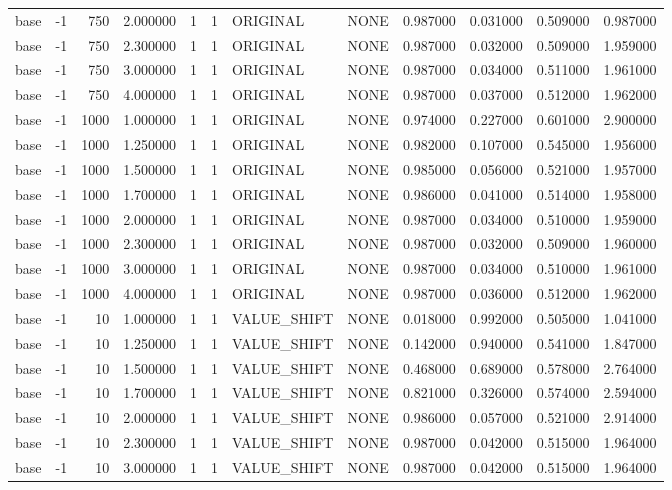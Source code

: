 \begin{tabular}{lrrrllllrrrr}
base & -1 & 750 & 2.000000 & 1 & 1 & ORIGINAL & NONE & 0.987000 & 0.031000 & 0.509000 & 0.987000 \\
base & -1 & 750 & 2.300000 & 1 & 1 & ORIGINAL & NONE & 0.987000 & 0.032000 & 0.509000 & 1.959000 \\
base & -1 & 750 & 3.000000 & 1 & 1 & ORIGINAL & NONE & 0.987000 & 0.034000 & 0.511000 & 1.961000 \\
base & -1 & 750 & 4.000000 & 1 & 1 & ORIGINAL & NONE & 0.987000 & 0.037000 & 0.512000 & 1.962000 \\
base & -1 & 1000 & 1.000000 & 1 & 1 & ORIGINAL & NONE & 0.974000 & 0.227000 & 0.601000 & 2.900000 \\
base & -1 & 1000 & 1.250000 & 1 & 1 & ORIGINAL & NONE & 0.982000 & 0.107000 & 0.545000 & 1.956000 \\
base & -1 & 1000 & 1.500000 & 1 & 1 & ORIGINAL & NONE & 0.985000 & 0.056000 & 0.521000 & 1.957000 \\
base & -1 & 1000 & 1.700000 & 1 & 1 & ORIGINAL & NONE & 0.986000 & 0.041000 & 0.514000 & 1.958000 \\
base & -1 & 1000 & 2.000000 & 1 & 1 & ORIGINAL & NONE & 0.987000 & 0.034000 & 0.510000 & 1.959000 \\
base & -1 & 1000 & 2.300000 & 1 & 1 & ORIGINAL & NONE & 0.987000 & 0.032000 & 0.509000 & 1.960000 \\
base & -1 & 1000 & 3.000000 & 1 & 1 & ORIGINAL & NONE & 0.987000 & 0.034000 & 0.510000 & 1.961000 \\
base & -1 & 1000 & 4.000000 & 1 & 1 & ORIGINAL & NONE & 0.987000 & 0.036000 & 0.512000 & 1.962000 \\
base & -1 & 10 & 1.000000 & 1 & 1 & VALUE_SHIFT & NONE & 0.018000 & 0.992000 & 0.505000 & 1.041000 \\
base & -1 & 10 & 1.250000 & 1 & 1 & VALUE_SHIFT & NONE & 0.142000 & 0.940000 & 0.541000 & 1.847000 \\
base & -1 & 10 & 1.500000 & 1 & 1 & VALUE_SHIFT & NONE & 0.468000 & 0.689000 & 0.578000 & 2.764000 \\
base & -1 & 10 & 1.700000 & 1 & 1 & VALUE_SHIFT & NONE & 0.821000 & 0.326000 & 0.574000 & 2.594000 \\
base & -1 & 10 & 2.000000 & 1 & 1 & VALUE_SHIFT & NONE & 0.986000 & 0.057000 & 0.521000 & 2.914000 \\
base & -1 & 10 & 2.300000 & 1 & 1 & VALUE_SHIFT & NONE & 0.987000 & 0.042000 & 0.515000 & 1.964000 \\
base & -1 & 10 & 3.000000 & 1 & 1 & VALUE_SHIFT & NONE & 0.987000 & 0.042000 & 0.515000 & 1.964000 \\

\end{tabular}
